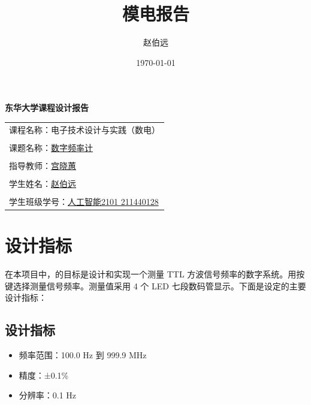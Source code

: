 \documentclass[UTF8,titlepage,a4paper]{ctexart}
\numberwithin{figure}{section}
\begin{document}
\title{模电报告}
\author{赵伯远}
\date{\today}
\thispagestyle{empty}
\begin{center}
{\fontsize{30pt}{21pt}\selectfont \textbf{东华大学课程设计报告}}

\vspace{10cm}

\begin{tabular}{l}
    {\large 课程名称：电子技术设计与实践（数电）} \\
    \\
    \large{课题名称：\underline{\hspace{58pt}数字频率计\hspace{58pt}}}  \\
    \\
    \large{指导教师：\underline{\hspace{70pt}宫晓蕙\hspace{70pt}}} \\
    \\
    \large{学生姓名：\underline{\hspace{70pt}赵伯远\hspace{70pt}}} \\
    \\
    \large{学生班级学号：\underline{\hspace{11pt}人工智能2101 211440128\hspace{11pt}}} \\
    \end{tabular}
\end{center}
\clearpage
\setcounter{page}{1}
\tableofcontents
\clearpage

\section{设计指标}

在本项目中，的目标是设计和实现一个测量 TTL 方波信号频率的数字系统。用按键选择测量信号频率。测量值采用 4 个 LED 七段数码管显示。下面是设定的主要设计指标：

\subsection{设计指标}
\begin{itemize}
    \item 频率范围：100.0 Hz 到 999.9 MHz
    \item 精度：±0.1\%
    \item 分辨率：0.1 Hz
\end{itemize}
\end{document}

